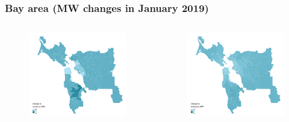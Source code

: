 \documentclass[aspectratio=169, t]{beamer}
\begin{document}
\begin{frame}[label = bay_example]
\frametitle{Bay area (MW changes in January 2019)}
    \begin{columns}
        \begin{column}{0.50\textwidth}
            \vspace{-4mm}
            \begin{figure}
                \centering
                \includegraphics[scale = 0.36]{maps_events/output/bay_area_2018-12_statutory_mw.png}
            \end{figure}   
        \end{column}
        \begin{column}{0.50\textwidth}
            \vspace{-4mm}
            \begin{figure}
                \centering
                \includegraphics[scale = 0.36]{maps_events/output/bay_area2018-12_wkp_mw.png}

\end{figure}
\end{column}
\end{columns}
\end{frame}
\end{document}
